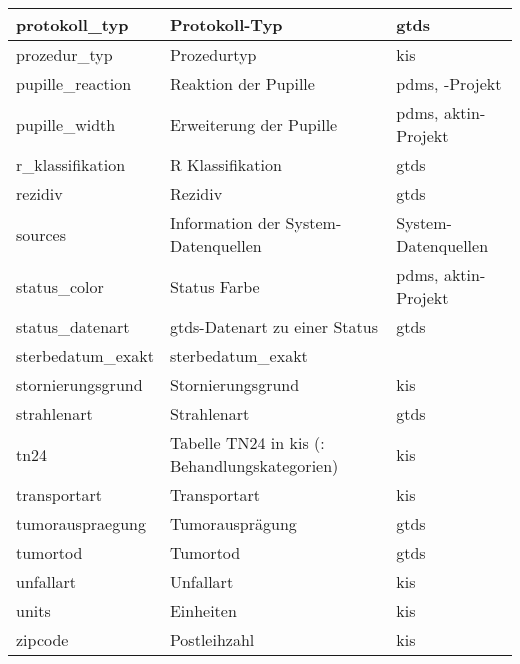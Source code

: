 \begin{longtable}{||p{5cm}|p{7cm}|p{4cm}||}
  	protokoll\_typ & Protokoll-Typ & \ac{gtds}\\ \hline
  	prozedur\_typ & Prozedurtyp & \ac{kis}\\ \hline
  	pupille\_reaction & Reaktion der Pupille & \ac{pdms}, \acsu{aktin}-Projekt \\ \hline
  	pupille\_width & Erweiterung der Pupille & \ac{pdms}, \acs{aktin}-Projekt \\ \hline
  	r\_klassifikation & R Klassifikation & \ac{gtds} \\ \hline
  	rezidiv & Rezidiv & \ac{gtds}\\ \hline
  	sources & Information der System- Datenquellen & System- Datenquellen\\ \hline
  	status\_color & Status Farbe & \ac{pdms}, \acs{aktin}-Projekt \\ \hline
  	status\_datenart & \ac{gtds}-Datenart zu einer Status & \ac{gtds} \\ \hline
  	sterbedatum\_exakt & sterbedatum\_exakt & \\ \hline
  	stornierungsgrund & Stornierungsgrund & \ac{kis}\\ \hline
  	strahlenart & Strahlenart & \ac{gtds} \\ \hline
  	tn24 & Tabelle TN24 in \ac{kis} (\acsu{ish}: Behandlungskategorien) & \ac{kis} \\ \hline
  	transportart & Transportart & \ac{kis} \\ \hline
  	tumorauspraegung & Tumorausprägung & \ac{gtds} \\ \hline
  	tumortod & Tumortod & \ac{gtds} \\ \hline
  	unfallart & Unfallart & \ac{kis} \\ \hline
  	units & Einheiten & \ac{kis} \\ \hline
  	zipcode & Postleihzahl & \ac{kis} \\ \hline  
  \end{longtable}